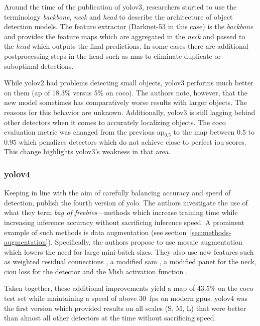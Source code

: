 \documentclass[final]{vutinfth} %
\begin{document}
Around the time of the publication of \gls{yolo}v3, researchers
started to use the terminology \emph{backbone}, \emph{neck} and
\emph{head} to describe the architecture of object detection
models. The feature extractor (Darknet-53 in this case) is the
\emph{backbone} and provides the feature maps which are aggregated in
the \emph{neck} and passed to the \emph{head} which outputs the final
predictions. In some cases there are additional postprocessing steps
in the head such as \gls{nms} to eliminate duplicate or suboptimal
detections.

While \gls{yolo}v2 had problems detecting small objects, \gls{yolo}v3
performs much better on them (\gls{ap} of 18.3\% versus 5\% on
\gls{coco}). The authors note, however, that the new model sometimes
has comparatively worse results with larger objects. The reasons for
this behavior are unknown. Additionally, \gls{yolo}v3 is still lagging
behind other detectors when it comes to accurately localizing
objects. The \gls{coco} evaluation metric was changed from the
previous \gls{ap}$_{0.5}$ to the \gls{map} between $0.5$ to $0.95$
which penalizes detectors which do not achieve close to perfect
\gls{iou} scores. This change highlights \gls{yolo}v3's weakness in
that area.

\subsubsection{\gls{yolo}v4}
\label{sssec:yolov4}

Keeping in line with the aim of carefully balancing accuracy and speed
of detection, \textcite{bochkovskiy2020} publish the fourth version of
\gls{yolo}. The authors investigate the use of what they term
\emph{bag of freebies}---methods which increase training time while
increasing inference accuracy without sacrificing inference speed. A
prominent example of such methods is data augmentation (see
section~\ref{sec:methods-augmentation}). Specifically, the authors
propose to use mosaic augmentation which lowers the need for large
mini-batch sizes. They also use new features such as weighted residual
connections \cite{shen2016}, a modified \gls{sam} \cite{woo2018}, a
modified \gls{panet} \cite{liu2018} for the neck, \gls{ciou} loss
\cite{zheng2020} for the detector and the Mish activation function
\cite{misra2020}.

Taken together, these additional improvements yield a \gls{map} of
43.5\% on the \gls{coco} test set while maintaining a speed of above
\qty{30}{fps} on modern \glspl{gpu}. \gls{yolo}v4 was the first
version which provided results on all scales (S, M, L) that were
better than almost all other detectors at the time without sacrificing
speed.
\end{document}
